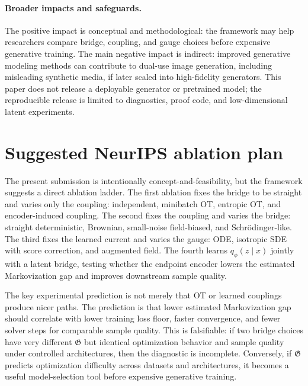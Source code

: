 \documentclass{article}
\numberwithin{equation}{section}
\begin{document}
\paragraph{Broader impacts and safeguards.}
The positive impact is conceptual and methodological: the framework may help researchers compare bridge, coupling, and gauge choices before expensive generative training. The main negative impact is indirect: improved generative modeling methods can contribute to dual-use image generation, including misleading synthetic media, if later scaled into high-fidelity generators. This paper does not release a deployable generator or pretrained model; the reproducible release is limited to diagnostics, proof code, and low-dimensional latent experiments.

\section{Suggested NeurIPS ablation plan}
\label{app:future_ablations}

The present submission is intentionally concept-and-feasibility, but the framework suggests a direct ablation ladder. The first ablation fixes the bridge to be straight and varies only the coupling: independent, minibatch OT, entropic OT, and encoder-induced coupling. The second fixes the coupling and varies the bridge: straight deterministic, Brownian, small-noise field-biased, and Schr\"odinger-like. The third fixes the learned current and varies the gauge: ODE, isotropic SDE with score correction, and augmented field. The fourth learns \(q_\phi(z\mid x)\) jointly with a latent bridge, testing whether the endpoint encoder lowers the estimated Markovization gap and improves downstream sample quality.

The key experimental prediction is not merely that OT or learned couplings produce nicer paths. The prediction is that lower estimated Markovization gap should correlate with lower training loss floor, faster convergence, and fewer solver steps for comparable sample quality. This is falsifiable: if two bridge choices have very different \(\mathfrak G\) but identical optimization behavior and sample quality under controlled architectures, then the diagnostic is incomplete. Conversely, if \(\mathfrak G\) predicts optimization difficulty across datasets and architectures, it becomes a useful model-selection tool before expensive generative training.

\clearpage

\end{document}
